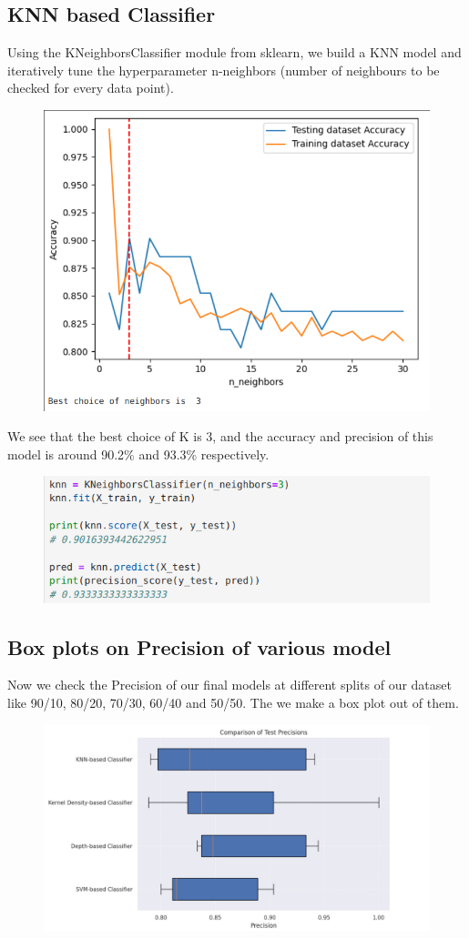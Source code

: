 \documentclass{article}
\begin{document}
\subsection{KNN based Classifier}
Using the KNeighborsClassifier module from sklearn, we build a KNN model and iteratively tune the hyperparameter n-neighbors (number of neighbours to be checked for every data point).

\begin{figure}[h]
\centering
    \includegraphics[width=0.75\linewidth]{knngraph.png}
\end{figure}
\noindent We see that the best choice of K is 3, and the accuracy and precision of this model is around 90.2\% and 93.3\% respectively.
\begin{figure}[h]
\centering
    \includegraphics[width=0.75\linewidth]{knn.png}
\end{figure}
\newpage
\subsection{Box plots on Precision of various model}
Now we check the Precision of our final models at different splits of our dataset like 90/10, 80/20, 70/30, 60/40 and 50/50.
The we make a box plot out of them.
\begin{figure}[h]
\centering
    \includegraphics[width=0.9\linewidth]{PrecisionBox.png}
\end{figure}
\end{document}
